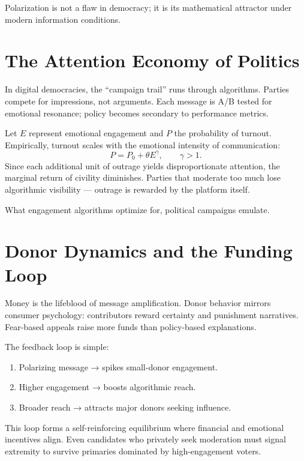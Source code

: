 \documentclass[12pt,twoside]{book}
\begin{document}
\begin{keyidea}
Polarization is not a flaw in democracy; it is its mathematical attractor under modern information conditions.
\end{keyidea}

\section{The Attention Economy of Politics}

In digital democracies, the “campaign trail” runs through algorithms.  
Parties compete for impressions, not arguments.  
Each message is A/B tested for emotional resonance; policy becomes secondary to performance metrics.

Let $E$ represent emotional engagement and $P$ the probability of turnout.  
Empirically, turnout scales with the emotional intensity of communication:
\[
P = P_0 + \theta E^\gamma, \qquad \gamma > 1.
\]
Since each additional unit of outrage yields disproportionate attention, the marginal return of civility diminishes.  
Parties that moderate too much lose algorithmic visibility --- outrage is rewarded by the platform itself. \\

\begin{keyidea}
What engagement algorithms optimize for, political campaigns emulate.
\end{keyidea}

\section{Donor Dynamics and the Funding Loop}

Money is the lifeblood of message amplification.  
Donor behavior mirrors consumer psychology: contributors reward certainty and punishment narratives.  
Fear-based appeals raise more funds than policy-based explanations.  

The feedback loop is simple:
\begin{enumerate}
  \item Polarizing message → spikes small-donor engagement.  
  \item Higher engagement → boosts algorithmic reach.  
  \item Broader reach → attracts major donors seeking influence.  
\end{enumerate}

This loop forms a self-reinforcing equilibrium where financial and emotional incentives align.  
Even candidates who privately seek moderation must signal extremity to survive primaries dominated by high-engagement voters.  \\
\end{document}
